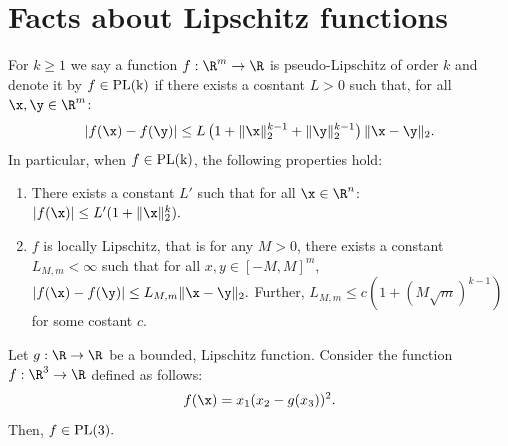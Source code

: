 %
%
%
%


\section{Facts about Lipschitz functions}\label{SM useful fact}
For $k\geq 1$ we say a function $f:\R^m\rightarrow\R$ is pseudo-Lipschitz of order $k$ and denote it by $f\in \rm{PL}(k)$ if there exists a cosntant $L>0$ such that, for all $\x,\y\in\R^m$:
\begin{align}
|f(\x)-f(\y)|\leq L\left(1+\|\x\|_2^{k-1}+\|\y\|_2^{k-1}\right)\|\x-\y\|_2.\label{PL func}
\end{align}
In particular, when $f\in\rm{PL}(k)$, the following properties hold:
\begin{enumerate}
\item There exists a constant $L'$ such that for all $\x\in\R^n$: $|f(\x)|\leq L'(1+\|\x\|_2^k).$

\item $f$ is locally Lipschitz, that is for any $M>0$, there exists a constant $L_{M,m}<\infty$ such that for all $x,y\in[-M,M]^m$,
$
|f(\x)-f(\y)| \leq L_{M,m}\|\x-\y\|_2.
$
Further, $L_{M,m}\leq c(1+(M\sqrt{m})^{k-1})$ for some costant $c$.
\end{enumerate}


\begin{lemma}
Let $g:\R\rightarrow\R$ be a bounded, Lipschitz function. Consider the function $f:\R^3\rightarrow\R$ defined as follows:
$$
f(\x) = x_1(x_2-g(x_3))^2.
$$
Then, $f\in\rm{PL}(3).$
\end{lemma}

